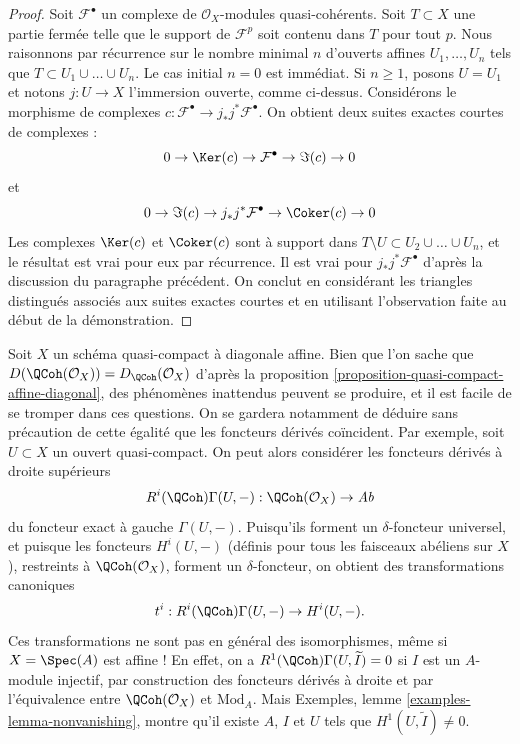 \begin{proof}
\medskip\noindent
Soit $\mathcal{F}^\bullet$ un complexe de
$\mathcal{O}_X$-modules quasi-cohérents. Soit $T \subset X$ une partie fermée
telle que le support de $\mathcal{F}^p$ soit contenu dans $T$
pour tout $p$. Nous raisonnons par récurrence sur le nombre minimal $n$
d'ouverts affines $U_1, \ldots, U_n$ tels que
$T \subset U_1 \cup \ldots \cup U_n$. Le cas initial $n = 0$ est immédiat.
Si $n \geq 1$, posons $U = U_1$ et notons $j : U \to X$
l'immersion ouverte, comme ci-dessus. Considérons le morphisme de complexes
$c : \mathcal{F}^\bullet \to j_*j^*\mathcal{F}^\bullet$.
On obtient deux suites exactes courtes de complexes :
$$
0 \to \Ker(c) \to \mathcal{F}^\bullet \to \Im(c) \to 0
$$
et
$$
0 \to \Im(c) \to j_*j^*\mathcal{F}^\bullet \to \Coker(c) \to 0
$$
Les complexes $\Ker(c)$ et $\Coker(c)$ sont à support
dans $T \setminus U \subset U_2 \cup \ldots \cup U_n$, et le résultat
est vrai pour eux par récurrence. Il est vrai pour
$j_*j^*\mathcal{F}^\bullet$ d'après la discussion du
paragraphe précédent. On conclut en considérant les triangles distingués
associés aux suites exactes courtes et en utilisant l'observation
faite au début de la démonstration.
\end{proof}

\begin{remark}[Avertissement]
\label{remark-warning-coherator}
Soit $X$ un schéma quasi-compact à diagonale affine. Bien que l'on sache
que $D(\QCoh(\mathcal{O}_X)) = D_\QCoh(\mathcal{O}_X)$ d'après la
proposition \ref{proposition-quasi-compact-affine-diagonal},
des phénomènes inattendus peuvent
se produire, et il est facile de se tromper dans ces questions. On se gardera notamment
de déduire sans précaution de cette égalité que les foncteurs dérivés coïncident.
Par exemple, soit $U \subset X$ un ouvert quasi-compact. On peut alors
considérer les foncteurs dérivés à droite supérieurs
$$
R^i(\QCoh)\Gamma(U, -) : \QCoh(\mathcal{O}_X) \to \textit{Ab}
$$
du foncteur exact à gauche $\Gamma(U, -)$. Puisqu'ils forment un
$\delta$-foncteur universel, et puisque les foncteurs $H^i(U, -)$ (définis pour tous les
faisceaux abéliens sur $X$), restreints à $\QCoh(\mathcal{O}_X)$, forment
un $\delta$-foncteur, on obtient des transformations canoniques
$$
t^i : R^i(\QCoh)\Gamma(U, -) \to H^i(U, -).
$$
Ces transformations ne sont pas en général des isomorphismes, même si $X = \Spec(A)$
est affine ! En effet, on a $R^1(\QCoh)\Gamma(U, \widetilde{I}) = 0$
si $I$ est un $A$-module injectif, par construction des foncteurs dérivés à droite
et par l'équivalence entre $\QCoh(\mathcal{O}_X)$ et $\text{Mod}_A$.
Mais Exemples, lemme \ref{examples-lemma-nonvanishing},
montre qu'il existe $A$, $I$ et $U$ tels que
$H^1(U, \widetilde{I}) \not = 0$.
\end{remark}




